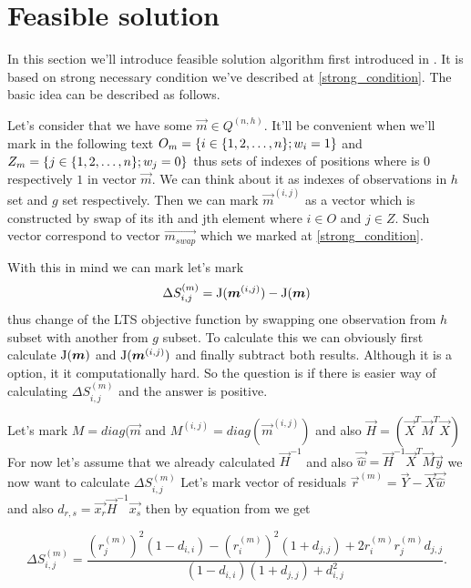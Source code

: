 \section{Feasible solution} \label{section_feasible_solution}
In this section we'll introduce feasible solution algorithm first introduced in \cite{hawkins:1994}.
It is based on strong necessary condition we've described at \ref{strong_condition}. 
The basic idea can be described as follows.

Let's consider that we have some $\vec{m} \in Q^{(n,h)}$. It'll be convenient when we'll mark in the following text $O_m = \{{i \in  \{{  1,2,\ldots , n  \}} ;w_i = 1\}}$ and $Z_m = \{{j \in  \{{  1,2,\ldots , n  \}} ;w_j = 0\}}$ thus sets of indexes of positions where is $0$ respectively $1$ in vector $\vec{m}$. We can think about it as indexes of observations in $h$ set and $g$ set respectively. Then we can mark $\vec{m}^{(i,j)}$ as a vector which is constructed by swap of its ith and jth element where $i \in O$ and $j \in Z$. Such vector correspond to vector $\vec{m_{swap}}$ which we marked at \ref{strong_condition}.

With this in mind we can mark let's mark 
\begin{equation}
	\Delta S^{(m)}_{i,j} = \operatorname{J}(\boldsymbol{m}^{(i,j)}) - \operatorname{J}(\boldsymbol{m})
\end{equation}
thus change of the LTS objective function by swapping one observation from $h$ subset with another from $g$ subset. To calculate this we can obviously first calculate  $\operatorname{J}(\boldsymbol{m})$ and $ \operatorname{J}(\boldsymbol{m}^{(i,j)})$ and finally subtract both results. Although it is a option, it it computationally hard. So the question is if there is easier way of calculating $\Delta S^{(m)}_{i,j}$ and the answer is positive. 

Let's mark  
$M = diag(\vec{m}$ and 
$M^(i,j) = diag(\vec{m}^{(i,j)})$ and also
$\vec{H} = (\vec{X}^T\vec{M}^T\vec{X})$
For now let's assume that we already calculated
$\vec{H}^{-1}$ and also $\vec{\hat{w}} = \vec{H}^{-1}\vec{X}^T\vec{M}\vec{y}$
we now want to calculate $\Delta S^{(m)}_{i,j}$
Let's mark vector of residuals 
$\vec{r}^{(m)} = \vec{Y} - \vec{X} \vec{\hat{w}} $
and also $d_{r,s} = \vec{x_r} \vec{H}^{-1}  \vec{x_s} $
then by equation from \cite{hawkins:1994} we get

\begin{equation}
	\Delta S^{(m)}_{i,j} = 
	\frac{({r}^{(m)}_{j})^2(1-d_{i,i})- ({r}^{(m)}_{i})^2(1+d_{j,j}) + 2{r}^{(m)}_{i}{r}^{(m)}_{j}d_{j,j}}
	{(1-d_{i,i})(1+d_{j,j}) + d_{i,j}^2}.
\end{equation}

